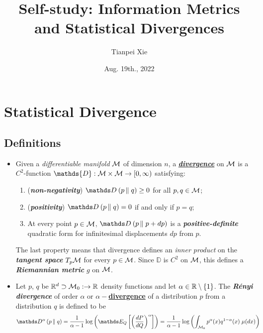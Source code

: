 \documentclass[11pt]{article}
\begin{document}
\title{Self-study: Information Metrics and Statistical Divergences}
\author{Tianpei Xie}
\date{ Aug. 19th., 2022 }
\maketitle
\tableofcontents
\newpage
\section{Statistical Divergence}
\subsection{Definitions}
\begin{itemize}
\item \begin{definition}
Given a \emph{differentiable manifold} ${\mathcal M}$ of dimension $n$, a \underline{\emph{\textbf{divergence}}} on ${\mathcal M}$ is a $C^{2}$-function $\mathds{D}: \cM\times \cM \to [0,\infty )$  satisfying:
\begin{enumerate}
\item (\textbf{\emph{non-negativity}}) $\divg{}{p}{q} \geq 0$ for all $p,q\in {\mathcal M}$;
\item (\textbf{\emph{positivity}}) $\divg{}{p}{q} =0$ if and only if $p=q$;
\item At every point $p\in {\mathcal M}$,  $\divg{}{p}{p+dp}$  is a \emph{\textbf{positive-definite}} quadratic form for infinitesimal displacements $dp$ from $p$. 
\end{enumerate} The last property means that divergence defines an \emph{inner product} on the \emph{\textbf{tangent space}} $T_{p}{\mathcal M}$ for every $p\in {\mathcal M}$. Since $\mathds{D}$ is $C^{2}$ on ${\mathcal M}$, this defines a \emph{\textbf{Riemannian metric}} $g$ on ${\mathcal M}$.
\end{definition}




\item \begin{definition}
Let $p$, $q$ be ${\mathbb R}^d \supset {\mathcal M}_{0}: \rightarrow  {\mathbb R}$ density functions and let $\alpha \in {\mathbb R} \setminus \left\{1\right\}$. The \emph{\textbf{R\'enyi divergence}} of order $\alpha$ or \underline{\textbf{$\alpha-$divergence}} of a distribution $p$ from a distribution $q$ is defined to be 
\begin{align}
\divg{\alpha}{p}{q} &= \frac{1}{\alpha -1}\log\paren{\E{Q}{\paren{\frac{dP}{dQ}}^{\alpha}}}  = \frac{1}{\alpha -1}\log\paren{\int_{ \cM_{0}}p^{\alpha}(x)q^{1-\alpha}(x)\;  \mu(dx)} \label{eqn: alpha_divg}
\end{align} 
\end{definition}


\end{itemize}
\end{document}
